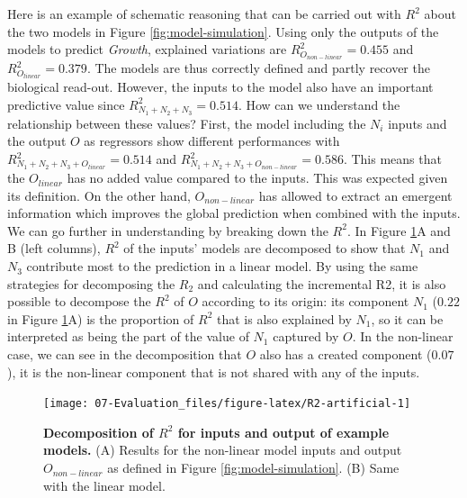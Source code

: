\documentclass[a4paper,12pt,twoside,onecolumn,openright,final,oldfontcommands]{memoir}
\begin{document}
Here is an example of schematic reasoning that can be carried out with
\(R^2\) about the two models in Figure \ref{fig:model-simulation}. Using
only the outputs of the models to predict \emph{Growth}, explained
variations are \(R^2_{O_{non-linear}}=0.455\) and
\(R^2_{O_{linear}}=0.379\). The models are thus correctly defined and
partly recover the biological read-out. However, the inputs to the model
also have an important predictive value since
\(R^2_{N_1+N_2+N_3}=0.514\). How can we understand the relationship
between these values? First, the model including the \(N_i\) inputs and
the output \(O\) as regressors show different performances with
\(R^2_{N_1+N_2+N_3+O_{linear}}=0.514\) and
\(R^2_{N_1+N_2+N_3+O_{non-linear}}=0.586\). This means that the
\(O_{linear}\) has no added value compared to the inputs. This was
expected given its definition. On the other hand, \(O_{non-linear}\) has
allowed to extract an emergent information which improves the global
prediction when combined with the inputs. We can go further in
understanding by breaking down the \(R^2\). In Figure
\ref{fig:R2-artificial}A and B (left columns), \(R^2\) of the inputs'
models are decomposed to show that \(N_1\) and \(N_3\) contribute most
to the prediction in a linear model. By using the same strategies for
decomposing the \(R_2\) and calculating the incremental R2, it is also
possible to decompose the \(R^2\) of \(O\) according to its origin: its
component \(N_1\) (\(0.22\) in Figure \ref{fig:R2-artificial}A) is the
proportion of \(R^2\) that is also explained by \(N_1\), so it can be
interpreted as being the part of the value of \(N_1\) captured by \(O\).
In the non-linear case, we can see in the decomposition that \(O\) also
has a created component (\(0.07\)), it is the non-linear component that
is not shared with any of the inputs.

\begin{figure}

{\centering \texttt{[image: 07-Evaluation\_files/figure-latex/R2-artificial-1]} 

}

\caption[Decomposition of $R^2$ for inputs and output of example models]{\textbf{Decomposition of \(R^2\) for inputs
and output of example models.} (A) Results for the non-linear model
inputs and output \(O_{non-linear}\) as defined in Figure
\ref{fig:model-simulation}. (B) Same with the linear model.}\label{fig:R2-artificial}
\end{figure}
\end{document}
